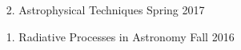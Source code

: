 \documentclass[margin, 10pt]{res} %
\newcommand\tab[1][1cm]{\hspace*{#1}}
\begin{document}
\begin{resume}
\begin{enumerate}
	\item[2.] Astrophysical Techniques \hfill Spring 2017
	
	\item[1.] Radiative Processes in Astronomy \hfill Fall 2016
	
\end{enumerate}









\end{resume}
\end{document}
